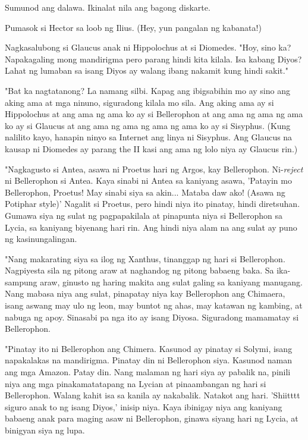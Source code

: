\documentclass[12pt,letterpaper]{report}
\begin{document}
Sumunod ang dalawa. Ikinalat nila ang bagong diskarte.

Pumasok si Hector sa loob ng Ilius. (Hey, yun pangalan ng kabanata!)

Nagkasalubong si Glaucus anak ni Hippolochus at si Diomedes. "Hoy, sino ka? Napakagaling mong mandirigma pero parang hindi kita kilala. Isa kabang Diyos? Lahat ng lumaban sa isang Diyos ay walang ibang nakamit kung hindi sakit."

"Bat ka nagtatanong? La namang silbi. Kapag ang ibigsabihin mo ay sino ang aking ama at mga ninuno, siguradong kilala mo sila. Ang aking ama ay si Hippolochus at ang ama ng ama ko ay si Bellerophon at ang ama ng ama ng ama ko ay si Glaucus at ang ama ng ama ng ama ng ama ko ay si Sisyphus. (Kung nalilito kayo, hanapin ninyo sa Internet ang linya ni Sisyphus. Ang Glaucus na kausap ni Diomedes ay parang the II kasi ang ama ng lolo niya ay Glaucus rin.)

"Nagkagusto si Antea, asawa ni Proetus hari ng Argos, kay Bellerophon. Ni-\textit{reject} ni Bellerophon si Antea. Kaya sinabi ni Antea sa kaniyang asawa, 'Patayin mo Bellerophon, Proetus! May sinabi siya sa akin...  Mataba daw ako! (Asawa ng Potiphar style)' Nagalit si Proetus, pero hindi niya ito pinatay, hindi diretsuhan. Gumawa siya ng sulat ng pagpapakilala at pinapunta niya si Bellerophon sa Lycia, sa kaniyang biyenang hari rin. Ang hindi niya alam na ang sulat ay puno ng kasinungalingan.

"Nang makarating siya sa ilog ng Xanthus, tinanggap ng hari si Bellerophon. Nagpiyesta sila ng pitong araw at naghandog ng pitong babaeng baka. Sa ika-sampung araw, ginusto ng haring makita ang sulat galing sa kaniyang manugang. Nang mabasa niya ang sulat, pinapatay niya kay Bellerophon ang Chimaera, isang aswang may ulo ng leon, may buntot ng ahas, may katawan ng kambing, at nabuga ng apoy. Sinasabi pa nga ito ay isang Diyosa. Siguradong mamamatay si Bellerophon.

"Pinatay ito ni Bellerophon ang Chimera. Kasunod ay pinatay si Solymi, isang napakalakas na mandirigma. Pinatay din ni Bellerophon siya. Kasunod naman ang mga Amazon. Patay din. Nang malaman ng hari siya ay pabalik na, pinili niya ang mga pinakamatatapang na Lycian at pinaambangan ng hari si Bellerophon. Walang kahit isa sa kanila ay nakabalik. Natakot ang hari. 'Shiitttt siguro anak to ng isang Diyos,' inisip niya. Kaya ibinigay niya ang kaniyang babaeng anak para maging asaw ni Bellerophon, ginawa siyang hari ng Lycia, at binigyan siya ng lupa.
\end{document}
